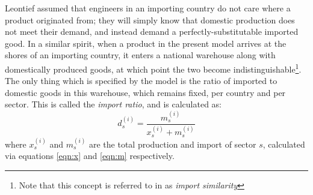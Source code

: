 \documentclass[a4paper]{article}
\begin{document}
Leontief assumed that engineers in an importing country do not care where a product originated from; they will simply know that domestic production does not meet their demand, and instead demand a perfectly-substitutable imported good.
In a similar spirit, when a product in the present model arrives at the shores of an importing country, it enters a national warehouse along with domestically produced goods, at which point the two become indistinguishable\footnote{Note that this concept is referred to in \textcite{Miller1985} as \textit{import similarity}}.
The only thing which is specified by the model is the ratio of imported to domestic goods in this warehouse, which remains fixed, per country and per sector. This is called the \textit{import ratio}, and is calculated as:
\begin{equation}\label{eqn:importratio}
d_s^{(i)} = \frac{m_s^{(i)}}{x_s^{(i)} + m_s^{(i)}}
\end{equation}
where $x_s^{(i)}$ and $m_s^{(i)}$ are the total production and import of sector $s$, calculated via equations \eqref{eqn:x} and \eqref{eqn:m} respectively.
\end{document}
